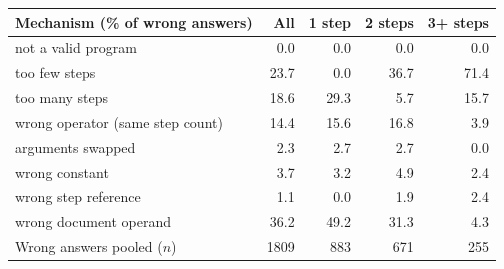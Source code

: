 \begin{tabular}{lrrrr}
\toprule
Mechanism (\% of wrong answers) & All & 1 step & 2 steps & 3+ steps \\
\midrule
not a valid program & 0.0 & 0.0 & 0.0 & 0.0 \\
too few steps & 23.7 & 0.0 & 36.7 & 71.4 \\
too many steps & 18.6 & 29.3 & 5.7 & 15.7 \\
wrong operator (same step count) & 14.4 & 15.6 & 16.8 & 3.9 \\
arguments swapped & 2.3 & 2.7 & 2.7 & 0.0 \\
wrong constant & 3.7 & 3.2 & 4.9 & 2.4 \\
wrong step reference & 1.1 & 0.0 & 1.9 & 2.4 \\
wrong document operand & 36.2 & 49.2 & 31.3 & 4.3 \\
\midrule 
Wrong answers pooled ($n$) & 1809 & 883 & 671 & 255 \\
\bottomrule
\end{tabular}
